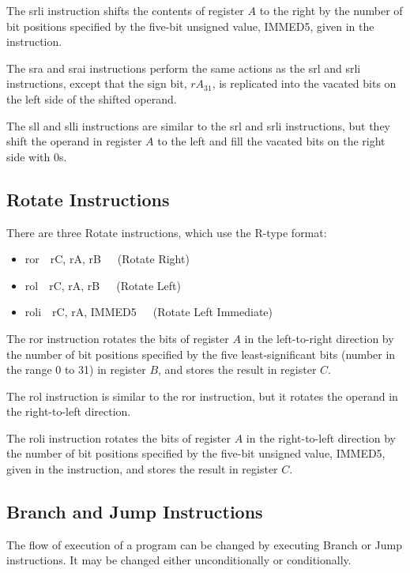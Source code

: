 \documentclass[11pt, twoside, pdftex]{article}
\begin{document}
\noindent
The {\sf srli} instruction shifts the contents of register $A$ to the right by the number 
of bit positions specified by the five-bit unsigned value, IMMED5, given in the instruction.
 

\noindent
The {\sf sra} and {\sf srai} instructions perform the same actions as the {\sf srl} and 
{\sf srli} instructions, except that the sign bit, $rA_{31}$, is replicated into the vacated 
bits on the left side of the shifted operand.
 

\noindent
The {\sf sll} and {\sf slli} instructions are similar to the {\sf srl} and {\sf srli}
instructions, but they shift the operand in register $A$ to the left and fill the vacated
bits on the right side with 0s.

\subsection{Rotate Instructions}

There are three Rotate instructions, which use the R-type format:
\begin{itemize}
\item {\sf ror~~rC, rA, rB}~~~(Rotate Right)
\item {\sf rol~~rC, rA, rB}~~~(Rotate Left)
\item {\sf roli~~rC, rA, IMMED5}~~~(Rotate Left Immediate)
\end{itemize}
\noindent
The {\sf ror} instruction rotates the bits of register $A$ in the left-to-right direction
by the number of bit positions specified by the five least-significant bits 
(number in the range 0 to 31) in register $B$, and stores the result in register $C$.
 

\noindent
The {\sf rol} instruction is similar to the {\sf ror} instruction, but it rotates the 
operand in the right-to-left direction.
 

\noindent
The {\sf roli} instruction rotates the bits of register $A$ in the right-to-left
direction by the number of bit positions specified by the five-bit unsigned value, 
IMMED5, given in the instruction, and stores the result in register $C$.

\subsection{Branch and Jump Instructions}

The flow of execution of a program can be changed by executing Branch or Jump instructions.
It may be changed either unconditionally or conditionally.
 
\end{document}
